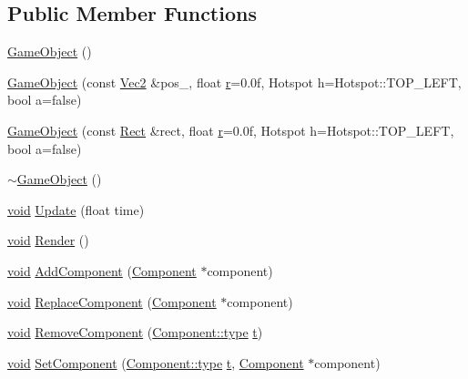 \subsection*{Public Member Functions}
\begin{DoxyCompactItemize}
\item 
\hyperlink{class_game_object_a0348e3ee2e83d56eafca7a3547f432c4}{Game\-Object} ()
\item 
\hyperlink{class_game_object_ae1aec0d07645812478ea21d13a016f3f}{Game\-Object} (const \hyperlink{class_vec2}{Vec2} \&pos\-\_\-, float \hyperlink{_s_d_l__opengl_8h_a42ce7cdc612e53abee15043f80220d97}{r}=0.\-0f, Hotspot h=\-Hotspot\-::\-T\-O\-P\-\_\-\-L\-E\-F\-T, bool a=false)
\item 
\hyperlink{class_game_object_a6175e45e39e7ff2f659b9ae345e95951}{Game\-Object} (const \hyperlink{class_rect}{Rect} \&rect, float \hyperlink{_s_d_l__opengl_8h_a42ce7cdc612e53abee15043f80220d97}{r}=0.\-0f, Hotspot h=\-Hotspot\-::\-T\-O\-P\-\_\-\-L\-E\-F\-T, bool a=false)
\item 
\hyperlink{class_game_object_ab82dfdb656f9051c0587e6593b2dda97}{$\sim$\-Game\-Object} ()
\item 
\hyperlink{_s_d_l__opengles2__gl2ext_8h_ae5d8fa23ad07c48bb609509eae494c95}{void} \hyperlink{class_game_object_aecdbe6a05d3183236f1bbec09fa235f8}{Update} (float time)
\item 
\hyperlink{_s_d_l__opengles2__gl2ext_8h_ae5d8fa23ad07c48bb609509eae494c95}{void} \hyperlink{class_game_object_a554078170496d6fc31af134e76e1e1bd}{Render} ()
\item 
\hyperlink{_s_d_l__opengles2__gl2ext_8h_ae5d8fa23ad07c48bb609509eae494c95}{void} \hyperlink{class_game_object_a6de86477e37962bcd4738b09c1c706aa}{Add\-Component} (\hyperlink{class_component}{Component} $\ast$component)
\item 
\hyperlink{_s_d_l__opengles2__gl2ext_8h_ae5d8fa23ad07c48bb609509eae494c95}{void} \hyperlink{class_game_object_a3e62d0cc338865a242977307910c9daf}{Replace\-Component} (\hyperlink{class_component}{Component} $\ast$component)
\item 
\hyperlink{_s_d_l__opengles2__gl2ext_8h_ae5d8fa23ad07c48bb609509eae494c95}{void} \hyperlink{class_game_object_a08d849601da7aa4be5d64492b728c967}{Remove\-Component} (\hyperlink{class_component_ad6d161b6acf7b843b55bb9feac7af71a}{Component\-::type} \hyperlink{_s_d_l__opengl_8h_a7d65d00ca3b0630d9b5c52df855b19f5}{t})
\item 
\hyperlink{_s_d_l__opengles2__gl2ext_8h_ae5d8fa23ad07c48bb609509eae494c95}{void} \hyperlink{class_game_object_abd34998206c99332aef59a4271baa0b4}{Set\-Component} (\hyperlink{class_component_ad6d161b6acf7b843b55bb9feac7af71a}{Component\-::type} \hyperlink{_s_d_l__opengl_8h_a7d65d00ca3b0630d9b5c52df855b19f5}{t}, \hyperlink{class_component}{Component} $\ast$component)

\end{DoxyCompactItemize}
